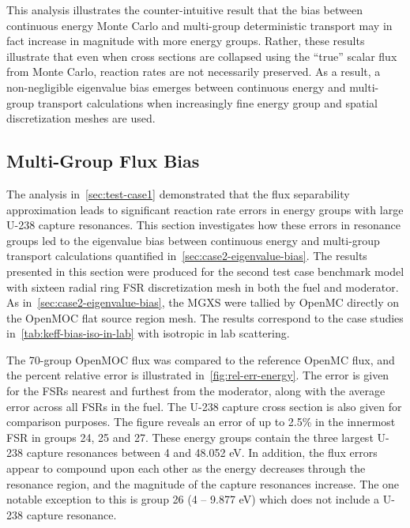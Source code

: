 This analysis illustrates the counter-intuitive result that the bias between continuous energy Monte Carlo and multi-group deterministic transport may in fact increase in magnitude with more energy groups. Rather, these results illustrate that even when cross sections are collapsed using the ``true'' scalar flux from Monte Carlo, reaction rates are not necessarily preserved. As a result, a non-negligible eigenvalue bias emerges between continuous energy and multi-group transport calculations when increasingly fine energy group and spatial discretization meshes are used.



\subsection{Multi-Group Flux Bias}
\label{sec:case2-flux-bias}

The analysis in~\autoref{sec:test-case1} demonstrated that the flux separability approximation leads to significant reaction rate errors in energy groups with large U-238 capture resonances. This section investigates how these errors in resonance groups led to the eigenvalue bias between continuous energy and multi-group transport calculations quantified in~\autoref{sec:case2-eigenvalue-bias}. The results presented in this section were produced for the second test case benchmark model with sixteen radial ring FSR discretization mesh in both the fuel and moderator. As in~\autoref{sec:case2-eigenvalue-bias}, the MGXS were tallied by OpenMC directly on the OpenMOC flat source region mesh. The results correspond to the case studies in~\autoref{tab:keff-bias-iso-in-lab} with isotropic in lab scattering.

The 70-group OpenMOC flux was compared to the reference OpenMC flux, and the percent relative error is illustrated in~\autoref{fig:rel-err-energy}. The error is given for the FSRs nearest and furthest from the moderator, along with the average error across all FSRs in the fuel. The U-238 capture cross section is also given for comparison purposes. The figure reveals an error of up to 2.5\% in the innermost FSR in groups 24, 25 and 27. These energy groups contain the three largest U-238 capture resonances between 4 and 48.052 eV. In addition, the flux errors appear to compound upon each other as the energy decreases through the resonance region, and the magnitude of the capture resonances increase. The one notable exception to this is group 26 (4 -- 9.877 eV) which does not include a U-238 capture resonance.

